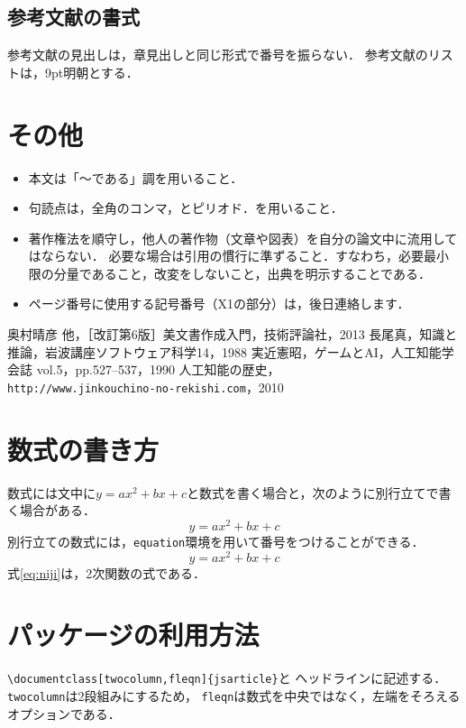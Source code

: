 \documentclass[twocolumn,fleqn]{jsarticle}
\begin{document}
\subsection{参考文献の書式}
参考文献の見出しは，章見出しと同じ形式で番号を振らない．
参考文献のリストは，9pt明朝とする．

\section{その他}
\begin{itemize}
\item 本文は「～である」調を用いること．
\item 句読点は，全角のコンマ，とピリオド．を用いること．
\item 著作権法を順守し，他人の著作物（文章や図表）を自分の論文中に流用してはならない．
必要な場合は引用の慣行に準ずること．すなわち，必要最小限の分量であること，改変をしないこと，出典を明示することである．
\item ページ番号に使用する記号番号（X1の部分）は，後日連絡します．
\end{itemize}

\begin{thebibliography}{9}\small
{} 奥村晴彦 他，［改訂第6版］\LaTeXe{}美文書作成入門，技術評論社，2013
 長尾真，知識と推論，岩波講座ソフトウェア科学14，1988
 実近憲昭，ゲームとAI，人工知能学会誌 vol.5，pp.527--537，1990
 人工知能の歴史，\\\verb|http://www.jinkouchino-no-rekishi.com|，2010
\end{thebibliography}

\section{数式の書き方}
数式には文中に$y=ax^2+bx+c$と数式を書く場合と，次のように別行立てで書く場合がある．
\[y=ax^2+bx+c\]
別行立ての数式には，\verb|equation|環境を用いて番号をつけることができる．
\begin{equation}
y=ax^2+bx+c
\label{eq:niji}
\end{equation}
式\ref{eq:niji}は，2次関数の式である．

\section{パッケージの利用方法}
\verb|\documentclass[twocolumn,fleqn]{jsarticle}|と
ヘッドラインに記述する．
\verb|twocolumn|は2段組みにするため，
\verb|fleqn|は数式を中央ではなく，左端をそろえるオプションである．
\end{document}
